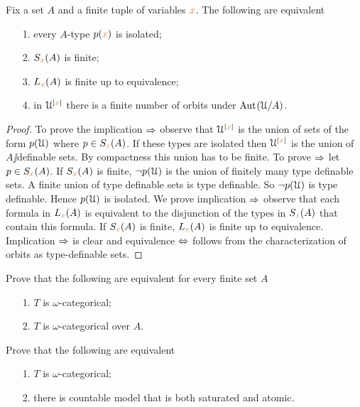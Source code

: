 \documentclass[creche.tex]{subfiles}
\begin{document}
\begin{proposition}\label{prop_ERNS_equivalents}
Fix a set $A$ and a finite tuple of variables ${\color{brown} x}$. The following are equivalent\nobreak
\begin{itemize}   
\item[1.] every $A$-type $p({\color{brown} x})$ is isolated;
\item[2.] $S_{\color{brown} x}(A)$ is finite;
\item[3.] $L_{\color{brown} x}(A)$ is finite up to equivalence;
\item[4.] in $\EuScript U^{|{\color{brown} x}|}$ there is a finite number of orbits under $\textrm{Aut\kern.15ex}(\EuScript U/A)$.
\end{itemize}
\end{proposition}
\begin{proof}To prove the implication $\Rightarrow$ observe that $\EuScript U^{|{\color{brown} x}|}$ is the union of sets of the form $p(\EuScript U)$ where $p\in S_{\color{brown} x}(A)$. If these types are isolated then $\EuScript U^{|{\color{brown} x}|}$ is the union of $A\jj$definable sets. By compactness this union has to be finite. To prove $\Rightarrow$ let $p\in S_{\color{brown} x}(A)$. If $S_{\color{brown} x}(A)$ is finite, $\neg p(\EuScript U)$ is the union of finitely many type definable sets. A finite union of type definable sets is type definable. So $\neg p(\EuScript U)$ is type definable. Hence $p(\EuScript U)$ is isolated. We prove implication $\Rightarrow$ observe that each formula in $L_{\color{brown} x}(A)$ is equivalent to the disjunction of the types in $S_{\color{brown} x}(A)$ that contain this formula. If $S_{\color{brown} x}(A)$ is finite, $L_{\color{brown} x}(A)$ is finite up to equivalence. Implication $\Rightarrow$ is clear and equivalence $\Leftrightarrow$ follows from the characterization of orbits as type-definable sets.
\end{proof}



\begin{exercise}\label{ex_omega_cat_overA}
Prove that the following are equivalent for every finite set $A$
\begin{itemize}   
\item[1.] $T$ is $\omega$-categorical;
\item[2.] $T$ is $\omega$-categorical over $A$.\QED
\end{itemize}
\end{exercise}

\begin{exercise}\label{ex_omega_cat_sat=atomic}
Prove that the following are equivalent
\begin{itemize}   
\item[1.] $T$ is $\omega$-categorical;
\item[2.] there is countable model that is both saturated and atomic.\QED 
\end{itemize}
\end{exercise}
\end{document}

